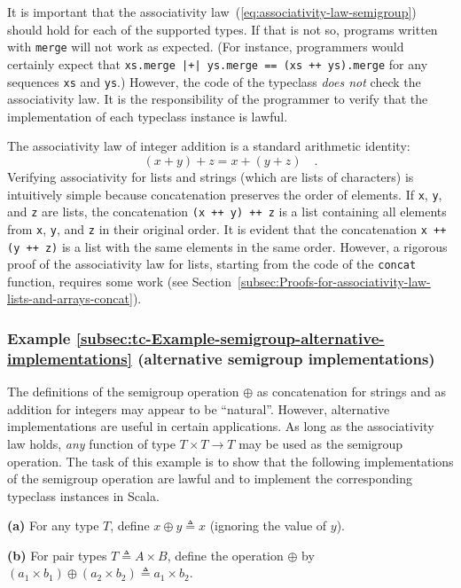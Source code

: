 It is important that the associativity law~(\ref{eq:associativity-law-semigroup})
should hold for each of the supported types. If that is not so, programs
written with \lstinline!merge! will not work as expected. (For instance,
programmers would certainly expect that \lstinline!xs.merge |+| ys.merge == (xs ++ ys).merge!
for any sequences \lstinline!xs! and \lstinline!ys!.) However, the
code of the typeclass \emph{does not} check the associativity law.
It is the responsibility of the programmer to verify that the implementation
of each typeclass instance is lawful. 

The associativity law of integer addition is a standard arithmetic
identity:
\[
\left(x+y\right)+z=x+\left(y+z\right)\quad.
\]
Verifying associativity for lists and strings (which are lists of
characters) is intuitively simple because concatenation preserves
the order of elements. If \lstinline!x!, \lstinline!y!, and \lstinline!z!
are lists, the concatenation \lstinline!(x ++ y) ++ z! is a list
containing all elements from \lstinline!x!, \lstinline!y!, and \lstinline!z!
in their original order. It is evident that the concatenation \lstinline!x ++ (y ++ z)!
is a list with the same elements in the same order. However, a rigorous
proof of the associativity law for lists, starting from the code of
the \lstinline!concat! function, requires some work (see Section~\ref{subsec:Proofs-for-associativity-law-lists-and-arrays-concat}). 

\subsubsection{Example \label{subsec:tc-Example-semigroup-alternative-implementations}\ref{subsec:tc-Example-semigroup-alternative-implementations}
(alternative semigroup implementations)}

The definitions of the semigroup operation $\oplus$ as concatenation
for strings and as addition for integers may appear to be \textsf{``}natural\textsf{''}.
However, alternative implementations are useful in certain applications.
As long as the associativity law holds, \emph{any} function of type
$T\times T\rightarrow T$ may be used as the semigroup operation.
The task of this example is to show that the following implementations
of the semigroup operation are lawful and to implement the corresponding
typeclass instances in Scala.

\textbf{(a)} For any type $T$, define $x\oplus y\triangleq x$ (ignoring
the value of $y$).

\textbf{(b)} For pair types $T\triangleq A\times B$, define the operation
$\oplus$ by $\left(a_{1}\times b_{1}\right)\oplus\left(a_{2}\times b_{2}\right)\triangleq a_{1}\times b_{2}$.

